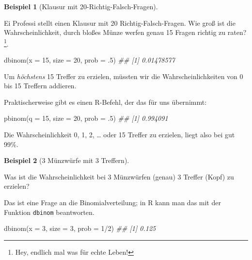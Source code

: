 \documentclass[
  a4paper,
  DIV=11]{scrreprt}
\newenvironment{Shaded}{\begin{snugshade}}{\end{snugshade}}
\newcommand{\AttributeTok}[1]{\textcolor[rgb]{0.40,0.45,0.13}{#1}}
\newcommand{\DecValTok}[1]{\textcolor[rgb]{0.68,0.00,0.00}{#1}}
\newcommand{\DocumentationTok}[1]{\textcolor[rgb]{0.37,0.37,0.37}{\textit{#1}}}
\newcommand{\FunctionTok}[1]{\textcolor[rgb]{0.28,0.35,0.67}{#1}}
\newcommand{\NormalTok}[1]{\textcolor[rgb]{0.00,0.23,0.31}{#1}}
\newcommand{\SpecialCharTok}[1]{\textcolor[rgb]{0.37,0.37,0.37}{#1}}
\theoremstyle{definition}
\newtheorem{example}{Beispiel}[chapter]
\theoremstyle{remark}
\begin{document}
\leavevmode{}%
\begin{example}[Klausur mit 20-Richtig-Falsch-Fragen]\label{exm-globus3}

Ei Professi stellt einen Klausur mit 20 Richtig-Falsch-Fragen. Wie groß
ist die Wahrscheinlichkeit, durch bloßes Münze werfen genau 15 Fragen
richtig zu raten?\footnote{Hey, endlich mal was für echte Leben!}.

\begin{Shaded}
\begin{Highlighting}[]
\FunctionTok{dbinom}\NormalTok{(}\AttributeTok{x =} \DecValTok{15}\NormalTok{, }\AttributeTok{size =} \DecValTok{20}\NormalTok{, }\AttributeTok{prob =}\NormalTok{ .}\DecValTok{5}\NormalTok{)}
\DocumentationTok{\#\# [1] 0.01478577}
\end{Highlighting}
\end{Shaded}

Um \emph{höchstens} 15 Treffer zu erzielen, müssten wir die
Wahrscheinlichkeiten von 0 bis 15 Treffern addieren.

Praktischerweise gibt es einen R-Befehl, der das für uns übernimmt:

\begin{Shaded}
\begin{Highlighting}[]
\FunctionTok{pbinom}\NormalTok{(}\AttributeTok{q =} \DecValTok{15}\NormalTok{, }\AttributeTok{size =} \DecValTok{20}\NormalTok{, }\AttributeTok{prob =}\NormalTok{ .}\DecValTok{5}\NormalTok{)}
\DocumentationTok{\#\# [1] 0.994091}
\end{Highlighting}
\end{Shaded}

Die Wahrscheinlichkeit 0, 1, 2, \ldots{} oder 15 Treffer zu erzielen,
liegt also bei gut 99\%.

\end{example}

\leavevmode{}%
\begin{example}[3 Münzwürfe mit 3 Treffern]\label{exm-globus4}

Was ist die Wahrscheinlichkeit bei 3 Münzwürfen (genau) 3 Treffer (Kopf)
zu erzielen?

Das ist eine Frage an die Binomialverteilung; in R kann man das mit der
Funktion \texttt{dbinom} beantworten.

\begin{Shaded}
\begin{Highlighting}[]
\FunctionTok{dbinom}\NormalTok{(}\AttributeTok{x =} \DecValTok{3}\NormalTok{, }\AttributeTok{size =} \DecValTok{3}\NormalTok{, }\AttributeTok{prob =} \DecValTok{1}\SpecialCharTok{/}\DecValTok{2}\NormalTok{)}
\DocumentationTok{\#\# [1] 0.125}
\end{Highlighting}
\end{Shaded}

\end{example}
\end{document}
